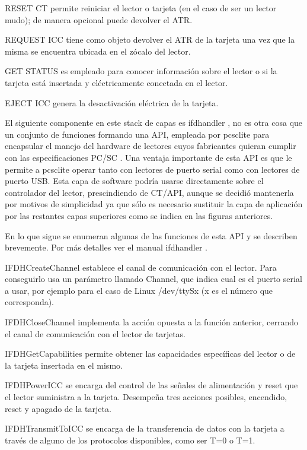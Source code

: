 \bigskip
RESET CT permite reiniciar el lector o tarjeta (en el caso de ser un lector mudo); de manera opcional puede devolver el ATR.

REQUEST ICC tiene como objeto devolver el ATR de la tarjeta una vez que la misma se encuentra ubicada en el zócalo del lector.

GET STATUS es empleado para conocer información sobre el lector o si la tarjeta está insertada y eléctricamente conectada en el lector. 

EJECT ICC genera la desactivación eléctrica de la tarjeta.

\bigskip
{}
El siguiente componente en este stack de capas es ifdhandler \cite{ifdhandler}, no es otra cosa que un conjunto de funciones formando una API, empleada por pcsclite para encapsular el manejo del hardware de  lectores cuyos fabricantes quieran cumplir con las especificaciones PC/SC \cite{pcsclite_esp}. Una ventaja importante de esta API es que le permite a pcsclite operar tanto con lectores de puerto serial como con lectores de puerto USB.
Esta capa de software podría usarse directamente sobre el controlador del lector, prescindiendo de CT/API, aunque se decidió mantenerla por motivos de simplicidad ya que sólo es necesario sustituir la capa de aplicación por las restantes capas superiores como se indica en las figuras anteriores.

\bigskip
En lo que sigue se enumeran algunas de las funciones de esta API y se describen brevemente. Por más detalles ver el manual ifdhandler \cite{ifdhandler}.

\bigskip
IFDHCreateChannel establece el canal de comunicación con el lector. Para conseguirlo usa un parámetro llamado Channel, que indica cual es el puerto serial a usar, por ejemplo para el caso de Linux /dev/ttySx (x es el número que corresponda).

IFDHCloseChannel implementa la acción opuesta a la función anterior, cerrando el canal de comunicación con el lector de tarjetas.

IFDHGetCapabilities permite obtener las capacidades específicas del lector o de la tarjeta insertada en el mismo.

IFDHPowerICC se encarga del control de las señales de alimentación y reset que el lector suministra a la tarjeta. Desempeña tres acciones posibles, encendido, reset y apagado de la tarjeta.

IFDHTransmitToICC se encarga de la transferencia de datos con la tarjeta a través de alguno de los protocolos disponibles, como ser T=0 o T=1.


